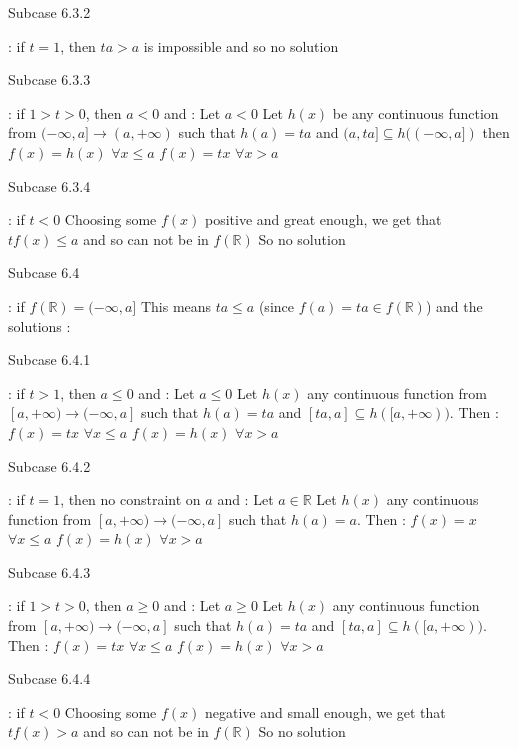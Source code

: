 \begin{solution}
\begin{bolded}Subcase 6.3.2\end{bolded} : if $t=1$, then $ta>a$ is impossible and so no solution

\begin{bolded}Subcase 6.3.3\end{bolded} : if $1>t>0$, then $a< 0$ and :
Let $a<0$
Let $h(x)$ be any continuous function from $(-\infty,a]\to(a,+\infty)$ such that $h(a)=ta$ and $(a,ta]\subseteq h((-\infty,a])$ then 
$f(x)=h(x)$ $\forall x\le a$
$f(x)=tx$ $\forall x>a$

\begin{bolded}Subcase 6.3.4\end{bolded} : if $t<0$
Choosing some $f(x)$ positive and great enough, we get that $tf(x)\le a$ and so can not be in $f(\mathbb R)$
So no solution

\begin{bolded}Subcase 6.4\end{bolded} : if $f(\mathbb R)=(-\infty,a]$
This means $ta\le a$ (since $f(a)=ta\in f(\mathbb R)$) and the solutions :

\begin{bolded}Subcase 6.4.1\end{bolded}: if $t>1$, then $a\le 0$ and :
Let $a\le 0$ 
Let $h(x)$ any continuous function from $[a,+\infty)\to(-\infty,a]$ such that $h(a)=ta$ and $[ta,a]\subseteq h([a,+\infty))$. Then :
$f(x)=tx$ $\forall x\le a$
$f(x)=h(x)$ $\forall x>a$

\begin{bolded}Subcase 6.4.2\end{bolded}: if $t=1$, then no constraint on $a$ and :
Let $a\in\mathbb R$ 
Let $h(x)$ any continuous function from $[a,+\infty)\to(-\infty,a]$ such that $h(a)=a$. Then :
$f(x)=x$ $\forall x\le a$
$f(x)=h(x)$ $\forall x>a$

\begin{bolded}Subcase 6.4.3\end{bolded} : if $1>t>0$, then $a\ge 0$ and :
Let $a\ge 0$ 
Let $h(x)$ any continuous function from $[a,+\infty)\to(-\infty,a]$ such that $h(a)=ta$ and $[ta,a]\subseteq h([a,+\infty))$. Then :
$f(x)=tx$ $\forall x\le a$
$f(x)=h(x)$ $\forall x>a$

\begin{bolded}Subcase 6.4.4\end{bolded} : if $t<0$
Choosing some $f(x)$ negative and small enough, we get that $tf(x)> a$ and so can not be in $f(\mathbb R)$
So no solution


\end{solution}
